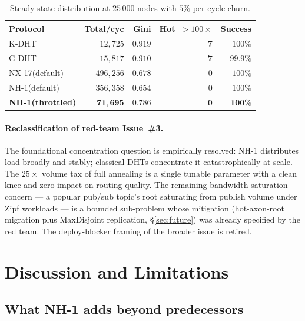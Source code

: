 \documentclass[conference]{IEEEtran}
\newcommand{\nhone}{NH-1\xspace}
\newcommand{\GDHT}{G-DHT\xspace}
\newcommand{\NXseventeen}{NX-17\xspace}
\begin{document}
\begin{table}[t]
\centering
\caption{Steady-state distribution at $25\,000$ nodes with $5\%$
per-cycle churn.}
\label{tab:bandwidth-churn}
\small
\begin{tabular}{@{}lrrrr@{}}
\toprule
\textbf{Protocol} & \textbf{Total/cyc} & \textbf{Gini} &
\textbf{Hot~$>100\times$} & \textbf{Success} \\
\midrule
\textsc{K-DHT} & $12{,}725$ & $0.919$ & $\mathbf{7}$ & $100\%$ \\
\GDHT & $15{,}817$ & $0.910$ & $\mathbf{7}$ & $99.9\%$ \\
\NXseventeen (default) & $496{,}256$ & $0.678$ & $0$ & $100\%$ \\
\nhone (default) & $356{,}358$ & $0.654$ & $0$ & $100\%$ \\
\textbf{\nhone (throttled)} & $\mathbf{71{,}695}$ & $\mathbf{0.786}$ &
$\mathbf{0}$ & $\mathbf{100\%}$ \\
\bottomrule
\end{tabular}
\end{table}

\paragraph{Reclassification of red-team Issue~\#3.} The foundational
concentration question is empirically resolved: \nhone distributes
load broadly and stably; classical DHTs concentrate it
catastrophically at scale. The $25\times$ volume tax of full
annealing is a single tunable parameter with a clean knee and zero
impact on routing quality. The remaining bandwidth-saturation concern
--- a popular pub/sub topic's root saturating from publish volume
under Zipf workloads --- is a bounded sub-problem whose mitigation
(hot-axon-root migration plus MaxDisjoint replication,
\S\ref{sec:future}) was already specified by the red team. The
deploy-blocker framing of the broader issue is retired.

\section{Discussion and Limitations}
\label{sec:discussion}

\subsection{What \nhone adds beyond predecessors}
\end{document}
